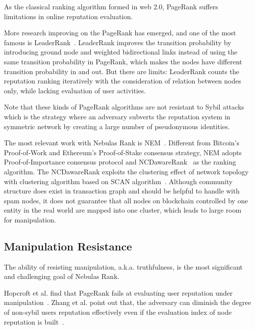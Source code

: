 As the classical ranking algorithm formed in web 2.0, PageRank suffers limitations in online reputation evaluation.


More research improving on the PageRank has emerged, and one of the most famous is LeaderRank~\cite{Li2014}. LeaderRank improves the transition probability by introducing ground node and weighted bidirectional links instead of using the same transition probability in PageRank, which makes the nodes have different transition probability in and out. But there are limits: LeaderRank counts the reputation ranking iteratively with the consideration of relation between nodes only, while lacking evaluation of user activities.


Note that these kinds of PageRank algorithms are not resistant to Sybil attacks~\cite{cheng2006manipulability} which is the strategy where an adversary subverts the reputation system in symmetric network by creating a large number of pseudonymous identities.

The most relevant work with Nebulas Rank is NEM~\cite{nem}. Different from Bitcoin's Proof-of-Work and Ethereum's Proof-of-Stake consensus strategy, NEM adopts Proof-of-Importance consensus protocol and NCDawareRank~\cite{Nikolakopoulos2013} as the ranking algorithm. The NCDawareRank exploits the clustering effect of network topology with clustering algorithm based on SCAN algorithm~\cite{xu2007scan}\cite{shiokawa2015scan}\cite{chang2017mathsf}. Although community structure does exist in transaction graph and should be helpful to handle with spam nodes, it does not guarantee that all nodes on blockchain controlled by one entity in the real world are mapped into one cluster, which leads to large room for manipulation.


\subsection{Manipulation Resistance}
The ability of resisting manipulation, a.k.a. truthfulness, is the most significant and challenging goal of Nebulas Rank. 

Hopcroft et al. find that PageRank fails at evaluating user reputation under manipulation~\cite{hopcroft2007manipulation}. Zhang et al. point out that, the adversary can diminish the degree of non-sybil users reputation effectively even if the evaluation index of node reputation is built~\cite{zhang2016truetop}.

